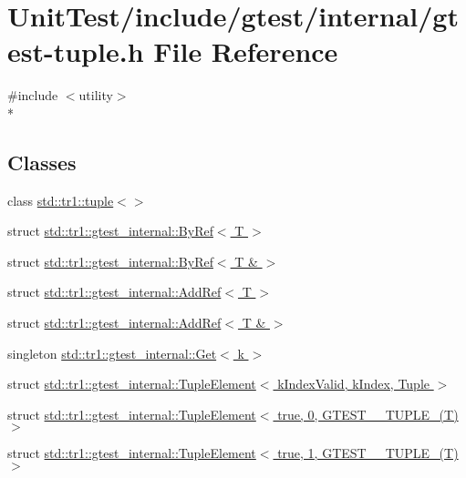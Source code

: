 \hypertarget{gtest-tuple_8h}{\section{Unit\+Test/include/gtest/internal/gtest-\/tuple.h File Reference}
\label{gtest-tuple_8h}
}
{\ttfamily \#include $<$utility$>$}\\*
\subsection*{Classes}
\begin{DoxyCompactItemize}
\item 
class \hyperlink{singletonstd_1_1tr1_1_1tuple}{std\+::tr1\+::tuple$<$$>$}
\item 
struct \hyperlink{structstd_1_1tr1_1_1gtest__internal_1_1_by_ref}{std\+::tr1\+::gtest\+\_\+internal\+::\+By\+Ref$<$ T $>$}
\item 
struct \hyperlink{structstd_1_1tr1_1_1gtest__internal_1_1_by_ref_3_01_t_01_6_01_4}{std\+::tr1\+::gtest\+\_\+internal\+::\+By\+Ref$<$ T \& $>$}
\item 
struct \hyperlink{structstd_1_1tr1_1_1gtest__internal_1_1_add_ref}{std\+::tr1\+::gtest\+\_\+internal\+::\+Add\+Ref$<$ T $>$}
\item 
struct \hyperlink{structstd_1_1tr1_1_1gtest__internal_1_1_add_ref_3_01_t_01_6_01_4}{std\+::tr1\+::gtest\+\_\+internal\+::\+Add\+Ref$<$ T \& $>$}
\item 
singleton \hyperlink{singletonstd_1_1tr1_1_1gtest__internal_1_1_get}{std\+::tr1\+::gtest\+\_\+internal\+::\+Get$<$ k $>$}
\item 
struct \hyperlink{structstd_1_1tr1_1_1gtest__internal_1_1_tuple_element}{std\+::tr1\+::gtest\+\_\+internal\+::\+Tuple\+Element$<$ k\+Index\+Valid, k\+Index, Tuple $>$}
\item 
struct \hyperlink{structstd_1_1tr1_1_1gtest__internal_1_1_tuple_element_3_01true_00_010_00_01_g_t_e_s_t__10___t_u_p_l_e___07_t_08_01_4}{std\+::tr1\+::gtest\+\_\+internal\+::\+Tuple\+Element$<$ true, 0, G\+T\+E\+S\+T\+\_\+\_\+\+T\+U\+P\+L\+E\+\_\+(\+T) $>$}
\item 
struct \hyperlink{structstd_1_1tr1_1_1gtest__internal_1_1_tuple_element_3_01true_00_011_00_01_g_t_e_s_t__10___t_u_p_l_e___07_t_08_01_4}{std\+::tr1\+::gtest\+\_\+internal\+::\+Tuple\+Element$<$ true, 1, G\+T\+E\+S\+T\+\_\+\_\+\+T\+U\+P\+L\+E\+\_\+(\+T) $>$}
\item 

\end{DoxyCompactItemize}

